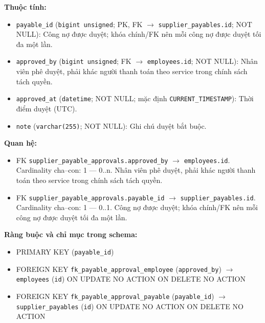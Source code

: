 \textbf{Thuộc tính:}

\begin{itemize}

\item \texttt{payable\_id} (\texttt{bigint unsigned}; PK, FK $\rightarrow$ \texttt{supplier\_payables.id}; NOT NULL): Công nợ được duyệt; khóa chính/FK nên mỗi công nợ được duyệt tối đa một lần.

\item \texttt{approved\_by} (\texttt{bigint unsigned}; FK $\rightarrow$ \texttt{employees.id}; NOT NULL): Nhân viên phê duyệt, phải khác người thanh toán theo service trong chính sách tách quyền.

\item \texttt{approved\_at} (\texttt{datetime}; NOT NULL; mặc định \texttt{CURRENT\_TIMESTAMP}): Thời điểm duyệt (UTC).

\item \texttt{note} (\texttt{varchar(255)}; NOT NULL): Ghi chú duyệt bắt buộc.

\end{itemize}

\textbf{Quan hệ:}

\begin{itemize}

\item FK \texttt{supplier\_payable\_approvals.approved\_by} $\rightarrow$ \texttt{employees.id}. Cardinality cha--con: 1 — 0..n. Nhân viên phê duyệt, phải khác người thanh toán theo service trong chính sách tách quyền.

\item FK \texttt{supplier\_payable\_approvals.payable\_id} $\rightarrow$ \texttt{supplier\_payables.id}. Cardinality cha--con: 1 — 0..1. Công nợ được duyệt; khóa chính/FK nên mỗi công nợ được duyệt tối đa một lần.

\end{itemize}

\textbf{Ràng buộc và chỉ mục trong schema:}

\begin{itemize}

\item PRIMARY KEY (\texttt{payable\_id})

\item FOREIGN KEY \texttt{fk\_payable\_approval\_employee} (\texttt{approved\_by}) $\rightarrow$ \texttt{employees} (\texttt{id}) ON UPDATE NO ACTION ON DELETE NO ACTION

\item FOREIGN KEY \texttt{fk\_payable\_approval\_payable} (\texttt{payable\_id}) $\rightarrow$ \texttt{supplier\_payables} (\texttt{id}) ON UPDATE NO ACTION ON DELETE NO ACTION

\end{itemize}

